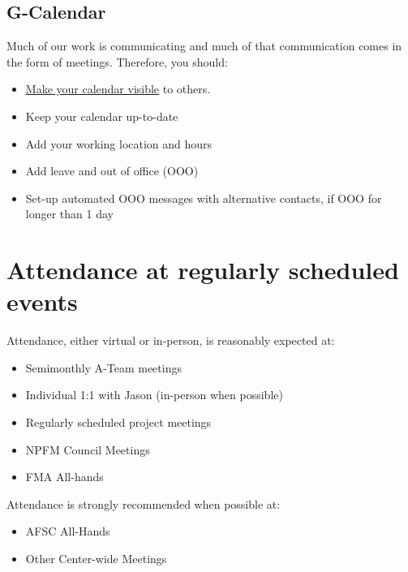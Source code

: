 \documentclass[
  letterpaper,
  DIV=11,
  numbers=noendperiod]{scrreprt}
\providecommand{\tightlist}{%
  \setlength{\itemsep}{0pt}\setlength{\parskip}{0pt}}\usepackage{longtable,booktabs,array}
\begin{document}
\hypertarget{g-calendar}{%
\subsection{G-Calendar}\label{g-calendar}}

Much of our work is communicating and much of that communication comes
in the form of meetings. Therefore, you should:

\begin{itemize}
\tightlist
\item
  \protect\hyperlink{sec-calendar}{Make your calendar visible} to
  others.\\
\item
  Keep your calendar up-to-date\\
\item
  Add your working location and hours\\
\item
  Add leave and out of office (OOO)\\
\item
  Set-up automated OOO messages with alternative contacts, if OOO for
  longer than 1 day
\end{itemize}

\hypertarget{attendance-at-regularly-scheduled-events}{%
\section{Attendance at regularly scheduled
events}\label{attendance-at-regularly-scheduled-events}}

Attendance, either virtual or in-person, is reasonably expected at:

\begin{itemize}
\tightlist
\item
  Semimonthly A-Team meetings
\item
  Individual 1:1 with Jason (in-person when possible)
\item
  Regularly scheduled project meetings\\
\item
  NPFM Council Meetings\\
\item
  FMA All-hands
\end{itemize}

Attendance is strongly recommended when possible at:

\begin{itemize}
\tightlist
\item
  AFSC All-Hands\\
\item
  Other Center-wide Meetings
\end{itemize}
\end{document}
